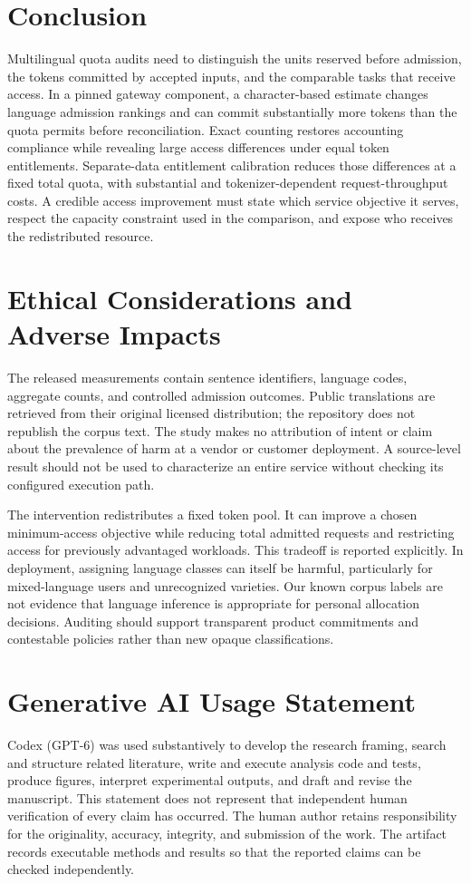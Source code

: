 \documentclass[manuscript,screen]{acmart}
\begin{document}
\section{Conclusion}
Multilingual quota audits need to distinguish the units reserved before admission, the tokens committed by accepted inputs, and the comparable tasks that receive access. In a pinned gateway component, a character-based estimate changes language admission rankings and can commit substantially more tokens than the quota permits before reconciliation. Exact counting restores accounting compliance while revealing large access differences under equal token entitlements. Separate-data entitlement calibration reduces those differences at a fixed total quota, with substantial and tokenizer-dependent request-throughput costs. A credible access improvement must state which service objective it serves, respect the capacity constraint used in the comparison, and expose who receives the redistributed resource.

\clearpage
\section*{Ethical Considerations and Adverse Impacts}
The released measurements contain sentence identifiers, language codes, aggregate counts, and controlled admission outcomes. Public translations are retrieved from their original licensed distribution; the repository does not republish the corpus text. The study makes no attribution of intent or claim about the prevalence of harm at a vendor or customer deployment. A source-level result should not be used to characterize an entire service without checking its configured execution path.

The intervention redistributes a fixed token pool. It can improve a chosen minimum-access objective while reducing total admitted requests and restricting access for previously advantaged workloads. This tradeoff is reported explicitly. In deployment, assigning language classes can itself be harmful, particularly for mixed-language users and unrecognized varieties. Our known corpus labels are not evidence that language inference is appropriate for personal allocation decisions. Auditing should support transparent product commitments and contestable policies rather than new opaque classifications.

\section*{Generative AI Usage Statement}
Codex (GPT-6) was used substantively to develop the research framing, search and structure related literature, write and execute analysis code and tests, produce figures, interpret experimental outputs, and draft and revise the manuscript. This statement does not represent that independent human verification of every claim has occurred. The human author retains responsibility for the originality, accuracy, integrity, and submission of the work. The artifact records executable methods and results so that the reported claims can be checked independently.
\end{document}
